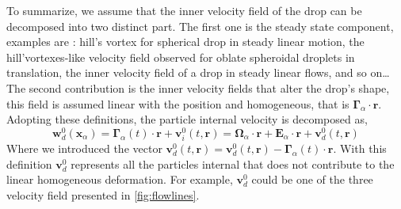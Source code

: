 To summarize, we assume that the inner velocity field of the drop can be decomposed into two distinct part. 
The first one is the steady state component, examples are : hill's vortex for spherical drop in steady linear motion, the hill'vortexes-like velocity field observed for oblate spheroidal droplets in translation,  the inner velocity field of a drop in steady linear flows, and so on\ldots 
The second contribution is the inner velocity fields that alter the drop's shape, this field is assumed linear with the position and homogeneous, that is $\bm\Gamma_\alpha\cdot \textbf{r}$. 
Adopting these definitions, the particle internal velocity is decomposed as, 
\begin{equation}
    \textbf{w}_{d}^0(\textbf{x}_\alpha)
    = \bm\Gamma_{\alpha}(t) \cdot \textbf{r}
    + \textbf{v}^0_{i}(t,\textbf{r})
    =\bm{\Omega}_{\alpha}\cdot \textbf{r}
    + \textbf{E}_{\alpha} \cdot \textbf{r}
    + \textbf{v}^0_{d}(t,\textbf{r})
    \label{eq:def_vel}
\end{equation}
Where we introduced the vector $\textbf{v}^0_d(t,\textbf{r}) =\textbf{v}^{0}_{d}(t,\textbf{r})  - \bm\Gamma_{\alpha}(t) \cdot \textbf{r}$.
With this definition $\textbf{v}_d^0$ represents all the particles internal that does not contribute to the linear homogeneous deformation. 
For example, $\textbf{v}_d^0$ could be one of the three velocity field presented in \ref{fig:flowlines}. 

